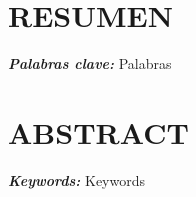         \providecommand{\palabrasclave}[1]
        {
          \small	
          \textbf{\textit{Palabras clave:}} #1
        }   
        \providecommand{\keywords}[1]
        {
          \small	
          \textbf{\textit{Keywords:}} #1
        }

\chapter*{RESUMEN}
    \palabrasclave{Palabras}
\chapter*{ABSTRACT}
    
    \keywords{Keywords}
